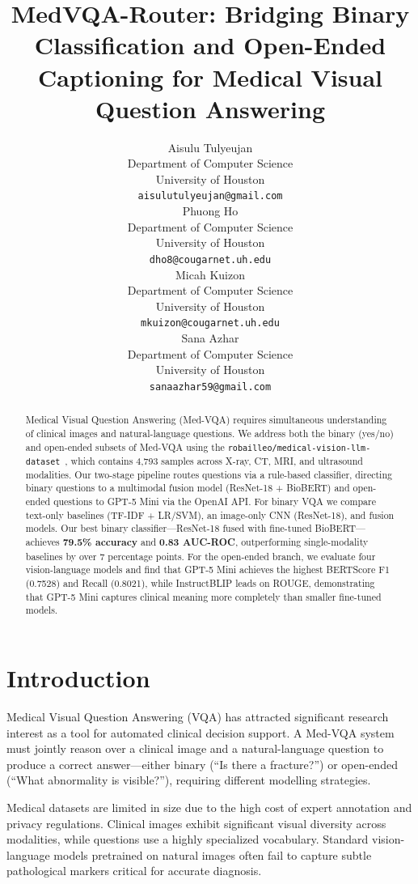 \documentclass{article}
\title{MedVQA-Router: Bridging Binary Classification and Open-Ended Captioning for Medical Visual Question Answering}
\author{
  Aisulu Tulyeujan \\
  Department of Computer Science \\
  University of Houston \\
  \texttt{aisulutulyeujan@gmail.com} \\
  \And
  Phuong Ho \\
  Department of Computer Science \\
  University of Houston \\
  \texttt{dho8@cougarnet.uh.edu} \\
  \And
  Micah Kuizon \\
  Department of Computer Science \\
  University of Houston \\
  \texttt{mkuizon@cougarnet.uh.edu} \\
  \And
  Sana Azhar \\
  Department of Computer Science \\
  University of Houston \\
  \texttt{sanaazhar59@gmail.com} \\
}
\begin{document}
\maketitle

\begin{abstract}
Medical Visual Question Answering (Med-VQA) requires simultaneous understanding
of clinical images and natural-language questions. We address both the binary
(yes/no) and open-ended subsets of Med-VQA using the
\texttt{robailleo/medical-vision-llm-dataset}~\cite{robailleo2024}, which
contains 4,793 samples across X-ray, CT, MRI, and ultrasound modalities. Our
two-stage pipeline routes questions via a rule-based classifier, directing
binary questions to a multimodal fusion model (ResNet-18 + BioBERT) and
open-ended questions to GPT-5 Mini via the OpenAI API. For binary VQA we
compare text-only baselines (TF-IDF + LR/SVM), an image-only CNN (ResNet-18),
and fusion models. Our best binary classifier---ResNet-18 fused with fine-tuned
BioBERT---achieves \textbf{79.5\% accuracy} and \textbf{0.83 AUC-ROC},
outperforming single-modality baselines by over 7 percentage points. For the
open-ended branch, we evaluate four vision-language models and find that GPT-5
Mini achieves the highest BERTScore F1 (0.7528) and Recall (0.8021),
while InstructBLIP leads on ROUGE, demonstrating that GPT-5 Mini captures clinical
meaning more completely than smaller fine-tuned models.
\end{abstract}


\section{Introduction}

Medical Visual Question Answering (VQA) has attracted significant research
interest as a tool for automated clinical decision support. A Med-VQA system
must jointly reason over a clinical image and a natural-language question to
produce a correct answer---either binary (``Is there a fracture?'') or
open-ended (``What abnormality is visible?''), requiring different modelling
strategies.

Medical datasets are limited in size due to the high cost of expert annotation
and privacy regulations. Clinical images exhibit significant visual diversity
across modalities, while questions use a highly specialized vocabulary. Standard
vision-language models pretrained on natural images often fail to capture subtle
pathological markers critical for accurate diagnosis.
\end{document}
